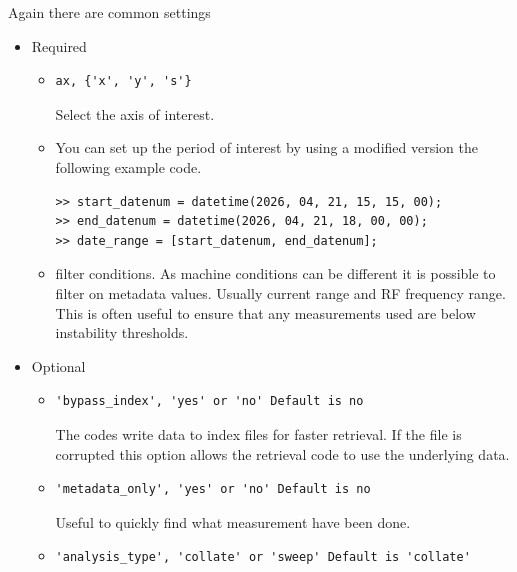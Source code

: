 \documentclass{report}
\begin{document}
Again there are common settings
\begin{itemize}
    \item Required
    \begin{itemize}
        \item{\begin{verbatim}
ax, {'x', 'y', 's'}
\end{verbatim}
Select the axis of interest.}
    \end{itemize}
    \begin{itemize}
        \item{You can set up the period of interest by using a modified version the following example code. 
\begin{verbatim}
>> start_datenum = datetime(2026, 04, 21, 15, 15, 00); 
>> end_datenum = datetime(2026, 04, 21, 18, 00, 00); 
>> date_range = [start_datenum, end_datenum]; 
\end{verbatim}
}
    \end{itemize}
    \begin{itemize}
        \item{filter conditions. As machine conditions can be different it is possible to filter on metadata values. Usually current range and RF frequency range. This is often useful to ensure that any measurements used are below instability thresholds. 
 }
    \end{itemize}
    \item Optional
     \begin{itemize}
        \item{\begin{verbatim}
'bypass_index', 'yes' or 'no' Default is no
\end{verbatim}
The codes write data to index files for faster retrieval. If the file is corrupted this option allows the retrieval code to use the underlying data.}
    \end{itemize}
     \begin{itemize}
        \item {\begin{verbatim}
'metadata_only', 'yes' or 'no' Default is no
\end{verbatim}
Useful to quickly find what measurement have been done.}
    \end{itemize}
     \begin{itemize}
        \item {\begin{verbatim}
'analysis_type', 'collate' or 'sweep' Default is 'collate'

\end{verbatim}}
\end{itemize}
\end{itemize}
\end{document}
